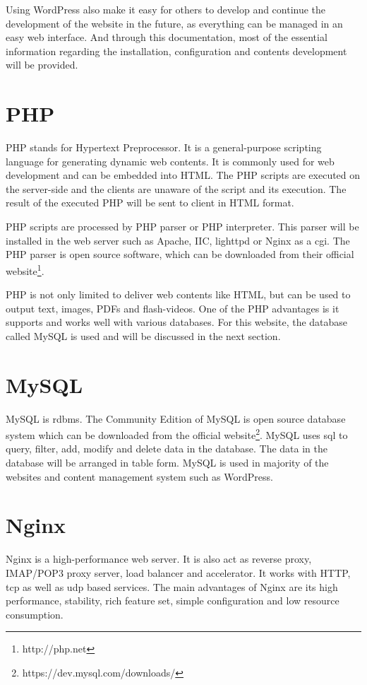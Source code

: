 Using WordPress also make it easy for others to develop and continue the development of the website in the future, as everything can be managed in an easy web interface. And through this documentation, most of the essential information regarding the installation, configuration and contents development will be provided.

\section{PHP}
PHP stands for Hypertext Preprocessor. It is a general-purpose scripting language for generating dynamic web contents. It is commonly used for web development and can be embedded into HTML. The PHP scripts are executed on the server-side and the clients are unaware of the script and its execution. The result of the executed PHP will be sent to client in HTML format.

PHP scripts are processed by PHP parser or PHP interpreter. This parser will be installed in the web server such as Apache, IIC, lighttpd or Nginx as a \ac{cgi}. The PHP parser is open source software, which can be downloaded from their official website\footnote{http://php.net}.

PHP is not only limited to deliver web contents like HTML, but can be used to output text, images, PDFs and flash-videos. One of the PHP advantages is it supports and works well with various databases. For this website, the database called MySQL is used and will be discussed in the next section.

\section{MySQL}
MySQL is \ac{rdbms}. The Community Edition of MySQL is open source database system which can be downloaded from the official website\footnote{https://dev.mysql.com/downloads/}. MySQL uses \ac{sql} to query, filter, add, modify and delete data in the database. The data in the database will be arranged in table form. MySQL is used in majority of the websites and content management system such as WordPress.

\section{Nginx}
Nginx is a high-performance web server. It is also act as reverse proxy, IMAP/POP3 proxy server, load balancer and accelerator. It works with HTTP, \ac{tcp} as well as \ac{udp} based services. The main advantages of Nginx are its high performance, stability, rich feature set, simple configuration and low resource consumption.

